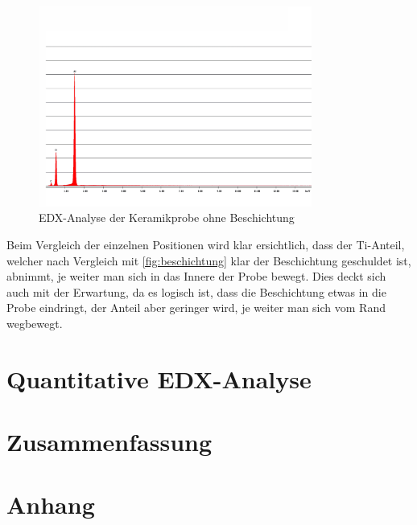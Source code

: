 \documentclass[12pt,english,ngerman]{scrartcl}
\begin{document}
\begin{figure}[H]
	\begin{center}
		\includegraphics[width =0.8\textwidth]{./figures/keramik.png}
	\end{center}
	\caption{EDX-Analyse der Keramikprobe ohne Beschichtung \cite{sein_foto}}
    \label{fig:keramik}
\end{figure}

Beim Vergleich der einzelnen Positionen wird klar ersichtlich, dass der Ti-Anteil, welcher nach Vergleich mit \autoref{fig:beschichtung}
klar der Beschichtung geschuldet ist, abnimmt, je weiter man sich in das Innere der Probe bewegt. Dies deckt sich auch
mit der Erwartung, da es logisch ist, dass die Beschichtung etwas in die Probe eindringt, der Anteil aber geringer wird, je
weiter man sich vom Rand wegbewegt.


\section{Quantitative EDX-Analyse}


\section{Zusammenfassung}


\section{Anhang}





\newpage

\printbibliography
\end{document}
